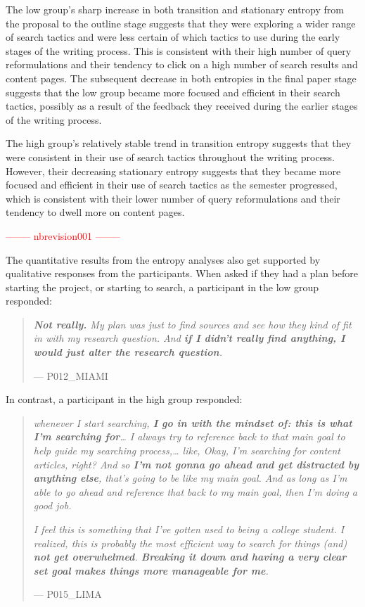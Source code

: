 \documentclass[letterpaper, nobind]{templates/ociamthesis}
\begin{document}
The low group's sharp increase in both transition and stationary entropy from the proposal to the outline stage suggests that they were exploring a wider range of search tactics and were less certain of which tactics to use during the early stages of the writing process.
This is consistent with their high number of query reformulations and their tendency to click on a high number of search results and content pages.
The subsequent decrease in both entropies in the final paper stage suggests that the low group became more focused and efficient in their search tactics, possibly as a result of the feedback they received during the earlier stages of the writing process.

The high group's relatively stable trend in transition entropy suggests that they were consistent in their use of search tactics throughout the writing process.
However, their decreasing stationary entropy suggests that they became more focused and efficient in their use of search tactics as the semester progressed, which is consistent with their lower number of query reformulations and their tendency to dwell more on content pages.

\textcolor{red}{-------- nbrevision001 --------}

The quantitative results from the entropy analyses also get supported by qualitative responses from the participants.
When asked if they had a plan before starting the project, or starting to search, a participant in the low group responded:

\begin{quote}
\emph{\textbf{Not really.} My plan was just to find sources and see how they kind of fit in with my research question. And \textbf{if I didn't really find anything, I would just alter the research question}.}

\hfill --- P012\_MIAMI
\end{quote}

In contrast, a participant in the high group responded:

\begin{quote}
\emph{whenever I start searching, \textbf{I go in with the mindset of: this is what I'm searching for}\ldots{} I always try to reference back to that main goal to help guide my searching process,\ldots{} like, Okay, I'm searching for content articles, right? And so \textbf{I'm not gonna go ahead and get distracted by anything else}, that's going to be like my main goal. And as long as I'm able to go ahead and reference that back to my main goal, then I'm doing a good job.}

\emph{I feel this is something that I've gotten used to being a college student. I realized, this is probably the most efficient way to search for things (and) \textbf{not get overwhelmed}. \textbf{Breaking it down and having a very clear set goal makes things more manageable for me}.}

\hfill --- P015\_LIMA
\end{quote}
\end{document}
